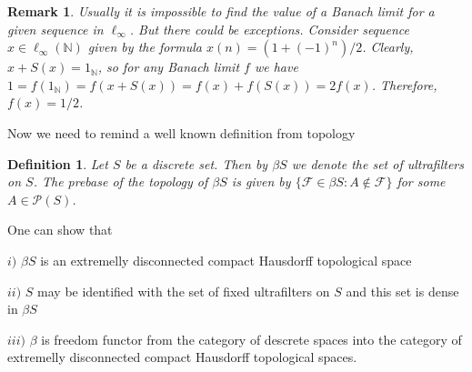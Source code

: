 \documentclass[12pt]{article}
\newtheorem{remark}[theorem]{Remark}
\newtheorem{definition}[theorem]{Definition}
\begin{document}
\begin{remark}\label{RemValueOfTheBanachLimit} Usually it is impossible to find the value of a Banach limit for a given sequence in $\ell_\infty$. But there could be exceptions. Consider sequence $x\in\ell_\infty(\mathbb{N})$ given by the formula $x(n)=(1+(-1)^n)/2$. Clearly, $x+S(x)=1_{\mathbb{N}}$, so for any Banach limit $f$ we have $1=f(1_{\mathbb{N}})=f(x+S(x))=f(x)+f(S(x))=2f(x)$. Therefore, $f(x)=1/2$.
\end{remark}

Now we need to remind a well known definition from topology

\begin{definition}\label{DefStoneCechCompactificationOfDiscerteSet} Let $S$ be a discrete set. Then by $\beta S$ we denote the set of ultrafilters on $S$. The prebase of the topology of $\beta S$ is given by $\{\mathcal{F}\in\beta S:A\notin\mathcal{F}\}$ for some $A\in\mathcal{P}(S)$.
\end{definition}

One can show that

$i)$ $\beta S$ is an extremelly disconnected compact Hausdorff topological space

$ii)$ $S$ may be identified with the set of fixed ultrafilters on $S$ and this set is dense in $\beta S$

$iii)$ $\beta$ is freedom functor from the category of descrete spaces into the category of extremelly disconnected compact Hausdorff topological spaces.
\end{document}
